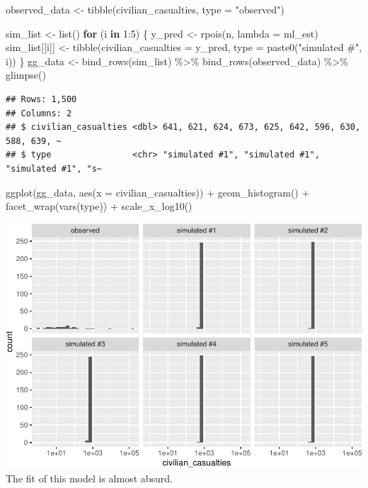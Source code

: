 \documentclass[
]{book}
\newenvironment{Shaded}{\begin{snugshade}}{\end{snugshade}}
\newcommand{\AttributeTok}[1]{\textcolor[rgb]{0.77,0.63,0.00}{#1}}
\newcommand{\ControlFlowTok}[1]{\textcolor[rgb]{0.13,0.29,0.53}{\textbf{#1}}}
\newcommand{\DecValTok}[1]{\textcolor[rgb]{0.00,0.00,0.81}{#1}}
\newcommand{\FunctionTok}[1]{\textcolor[rgb]{0.00,0.00,0.00}{#1}}
\newcommand{\NormalTok}[1]{#1}
\newcommand{\OtherTok}[1]{\textcolor[rgb]{0.56,0.35,0.01}{#1}}
\newcommand{\SpecialCharTok}[1]{\textcolor[rgb]{0.00,0.00,0.00}{#1}}
\newcommand{\StringTok}[1]{\textcolor[rgb]{0.31,0.60,0.02}{#1}}
\begin{document}
\begin{Shaded}
\begin{Highlighting}[]
\NormalTok{observed\_data }\OtherTok{\textless{}{-}} \FunctionTok{tibble}\NormalTok{(civilian\_casualties, }\AttributeTok{type =} \StringTok{"observed"}\NormalTok{)}

\NormalTok{sim\_list }\OtherTok{\textless{}{-}} \FunctionTok{list}\NormalTok{()}
\ControlFlowTok{for}\NormalTok{ (i }\ControlFlowTok{in} \DecValTok{1}\SpecialCharTok{:}\DecValTok{5}\NormalTok{) \{}
\NormalTok{  y\_pred }\OtherTok{\textless{}{-}} \FunctionTok{rpois}\NormalTok{(n, }\AttributeTok{lambda =}\NormalTok{ ml\_est)}
\NormalTok{  sim\_list[[i]] }\OtherTok{\textless{}{-}} \FunctionTok{tibble}\NormalTok{(}\AttributeTok{civilian\_casualties =}\NormalTok{ y\_pred, }
                          \AttributeTok{type =} \FunctionTok{paste0}\NormalTok{(}\StringTok{"simulated \#"}\NormalTok{, i))}
\NormalTok{\}}
\NormalTok{gg\_data }\OtherTok{\textless{}{-}} \FunctionTok{bind\_rows}\NormalTok{(sim\_list) }\SpecialCharTok{\%\textgreater{}\%}
  \FunctionTok{bind\_rows}\NormalTok{(observed\_data) }\SpecialCharTok{\%\textgreater{}\%}
  \FunctionTok{glimpse}\NormalTok{()}
\end{Highlighting}
\end{Shaded}

\begin{verbatim}
## Rows: 1,500
## Columns: 2
## $ civilian_casualties <dbl> 641, 621, 624, 673, 625, 642, 596, 630, 588, 639, ~
## $ type                <chr> "simulated #1", "simulated #1", "simulated #1", "s~
\end{verbatim}

\begin{Shaded}
\begin{Highlighting}[]
\FunctionTok{ggplot}\NormalTok{(gg\_data, }\FunctionTok{aes}\NormalTok{(}\AttributeTok{x =}\NormalTok{ civilian\_casualties)) }\SpecialCharTok{+} 
  \FunctionTok{geom\_histogram}\NormalTok{() }\SpecialCharTok{+} 
  \FunctionTok{facet\_wrap}\NormalTok{(}\FunctionTok{vars}\NormalTok{(type)) }\SpecialCharTok{+} 
  \FunctionTok{scale\_x\_log10}\NormalTok{()}
\end{Highlighting}
\end{Shaded}

\includegraphics{01-05-predictive-distribution_files/figure-latex/unnamed-chunk-6-1.pdf}
The fit of this model is almost absurd.
\end{document}
